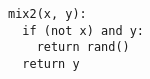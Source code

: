 \begin{lstlisting}[style=mystyle,language=customPython]
mix2(x, y):
  if (not x) and y:
    return rand()
  return y
 \end{lstlisting}
